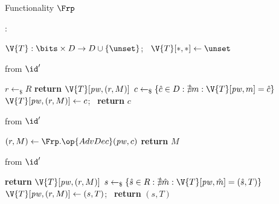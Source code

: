 \begin{interface}[nofloat]{Functionality $\Frp$ \\
}

{\scriptsize
\setlength{\columnsep}{1.4em}
\begin{multicols}{2}
:
\begin{algorithmic}[1]
\setcounter{contline}{0}\algcont
\State $\V{T} : \bits \times D \to D \cup \{\unset\}$; \ $\V{T}[*,*] \gets \unset$
\algsave
\end{algorithmic}
\vspace{1.4ex}

 \quad from $\id'$
\begin{algorithmic}[1]
\algcont
{} \label{ln:rphonest}
\State $r \gets_{\$} R$ \label{ln:rpcoins}
  \State \textbf{return} $\V{T}[\mathit{pw}, (r,M)]$
\EndIf
\State $c \gets_{\$} \{\hat{c} \in D : \nexists m : \V{T}[\mathit{pw}, m] = \hat{c}\}$ \label{ln:rpfresh}
\State $\V{T}[\mathit{pw}, (r,M)] \gets c$; \ \textbf{return} $c$
\algsave
\end{algorithmic}
\vspace{1.4ex}

 \quad from $\id'$
\begin{algorithmic}[1]
\algcont
{}
\State $(r, M) \gets \Frp.\op{AdvDec}(\mathit{pw}, c)$ \label{ln:rpselfcall}
\State \textbf{return} $M$ \label{ln:rpdiscard}
\algsave
\end{algorithmic}
\vspace{1.4ex}

\columnbreak

 \quad from $\id'$
\begin{algorithmic}[1]
\algcont
{} \label{ln:rpadvonly}
  \State \textbf{return} $\V{T}[\mathit{pw}, (r,M)]$
\EndIf
\State $s \gets_{\$} \{\hat{s} \in R : \nexists \hat{m} : \V{T}[\mathit{pw}, \hat{m}] = (\hat{s}, T)\}$ \label{ln:rphalf}
\State $\V{T}[\mathit{pw}, (r,M)] \gets (s, T)$; \ \textbf{return} $(s, T)$ \label{ln:rpforced}
\algsave
\end{algorithmic}
\vspace{1.4ex}


\end{multicols}}
\end{interface}
